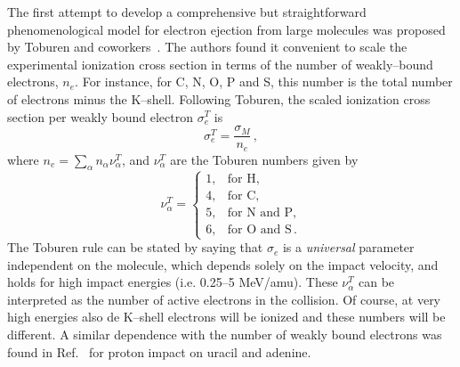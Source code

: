 \documentclass[preprint]{revtex4-2}
\begin{document}
The first attempt to develop a comprehensive but straightforward 
phenomenological model for electron ejection from large molecules was 
proposed by Toburen and coworkers~\cite{toburen1975,toburen1976}. 
The authors found it convenient to scale the experimental ionization 
cross section in terms of the number of weakly--bound electrons, $n_e$.
For instance, for C, N, O, P and S, this number is the total number of 
electrons minus the K--shell. Following Toburen, the scaled ionization 
cross section per weakly bound electron $\sigma_{e}^T$ is
\begin{equation}
\sigma_{e}^T=\frac{\sigma_{M}}{n_e}\,, 
\label{27} 
\end{equation}
where $n_e=\sum_{\alpha}n_{\alpha}\nu_{\alpha}^T$, and $\nu_{\alpha}^T$ 
are the Toburen numbers given by
\begin{equation}
\nu_{\alpha}^T=\left\{ 
\begin{array}{ll}
1, & \text{for H,} \\
4, & \text{for C,} \\ 
5, & \text{for N and P,} \\ 
6, & \text{for O and S}\,.
\end{array}\right.
\label{eq:nelec} 
\end{equation} 
The Toburen rule can be stated by saying that 
$\sigma_{e}$ is a \textit{universal} parameter independent on the 
molecule, which depends solely on the impact velocity, and holds for 
high impact energies (i.e. 0.25--5 MeV/amu).
These $\nu_{\alpha}^T$ can be interpreted as the number of active 
electrons in the collision. Of course, at very high energies also de 
K--shell electrons will be ionized and these numbers will be different.
A similar dependence with the number of weakly bound electrons was 
found in Ref.~\cite{itoh2013} for proton impact on uracil and adenine.
\end{document}
